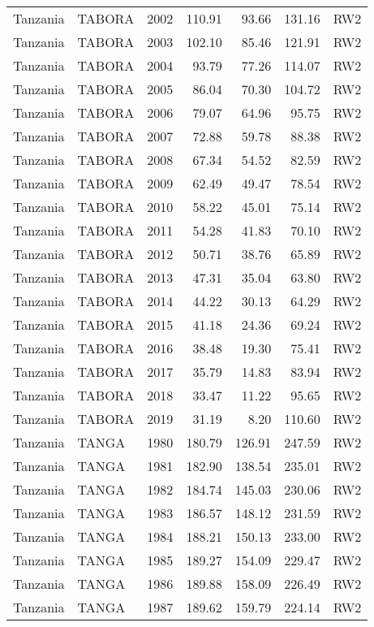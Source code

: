 \begin{longtable}{lllrrrl}
  Tanzania & TABORA & 2002 & 110.91 & 93.66 & 131.16 & RW2 \\ 
  Tanzania & TABORA & 2003 & 102.10 & 85.46 & 121.91 & RW2 \\ 
  Tanzania & TABORA & 2004 & 93.79 & 77.26 & 114.07 & RW2 \\ 
  Tanzania & TABORA & 2005 & 86.04 & 70.30 & 104.72 & RW2 \\ 
  Tanzania & TABORA & 2006 & 79.07 & 64.96 & 95.75 & RW2 \\ 
  Tanzania & TABORA & 2007 & 72.88 & 59.78 & 88.38 & RW2 \\ 
  Tanzania & TABORA & 2008 & 67.34 & 54.52 & 82.59 & RW2 \\ 
  Tanzania & TABORA & 2009 & 62.49 & 49.47 & 78.54 & RW2 \\ 
  Tanzania & TABORA & 2010 & 58.22 & 45.01 & 75.14 & RW2 \\ 
  Tanzania & TABORA & 2011 & 54.28 & 41.83 & 70.10 & RW2 \\ 
  Tanzania & TABORA & 2012 & 50.71 & 38.76 & 65.89 & RW2 \\ 
  Tanzania & TABORA & 2013 & 47.31 & 35.04 & 63.80 & RW2 \\ 
  Tanzania & TABORA & 2014 & 44.22 & 30.13 & 64.29 & RW2 \\ 
  Tanzania & TABORA & 2015 & 41.18 & 24.36 & 69.24 & RW2 \\ 
  Tanzania & TABORA & 2016 & 38.48 & 19.30 & 75.41 & RW2 \\ 
  Tanzania & TABORA & 2017 & 35.79 & 14.83 & 83.94 & RW2 \\ 
  Tanzania & TABORA & 2018 & 33.47 & 11.22 & 95.65 & RW2 \\ 
  Tanzania & TABORA & 2019 & 31.19 & 8.20 & 110.60 & RW2 \\ 
  Tanzania & TANGA & 1980 & 180.79 & 126.91 & 247.59 & RW2 \\ 
  Tanzania & TANGA & 1981 & 182.90 & 138.54 & 235.01 & RW2 \\ 
  Tanzania & TANGA & 1982 & 184.74 & 145.03 & 230.06 & RW2 \\ 
  Tanzania & TANGA & 1983 & 186.57 & 148.12 & 231.59 & RW2 \\ 
  Tanzania & TANGA & 1984 & 188.21 & 150.13 & 233.00 & RW2 \\ 
  Tanzania & TANGA & 1985 & 189.27 & 154.09 & 229.47 & RW2 \\ 
  Tanzania & TANGA & 1986 & 189.88 & 158.09 & 226.49 & RW2 \\ 
  Tanzania & TANGA & 1987 & 189.62 & 159.79 & 224.14 & RW2 \\ 

\end{longtable}

